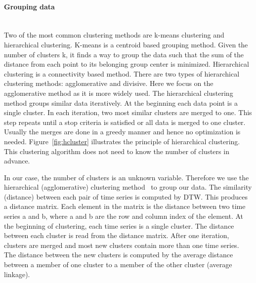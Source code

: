 \paragraph{Grouping data} ~\\
Two of the most common clustering methods are k-means clustering and hierarchical clustering. K-means is a centroid based grouping method. Given the number of clusters k, it finds a way to group the data such that the sum of the distance from each point to its belonging group center is minimized. Hierarchical clustering is a connectivity based method. There are two types of hierarchical clustering methods: agglomerative and divisive. Here we focus on the agglomerative method as it is more widely used. The hierarchical clustering method groups similar data iteratively. At the beginning each data point is a single cluster. In each iteration, two most similar clusters are merged to one. This step repeats until a stop criteria is satisfied or all data is merged to one cluster. Usually the merges are done in a greedy manner and hence no optimization is needed. Figure~\ref{fig:hcluster} illustrates the principle of hierarchical clustering. This clustering algorithm does not need to know the number of clusters in advance.

In our case, the number of clusters is an unknown variable. Therefore we use the hierarchical (agglomerative) clustering method~\cite{willett1988recent} to group our data. The similarity (distance) between each pair of time series is computed by DTW. This produces a distance matrix. Each element in the matrix is the distance between two time series a and b, where a and b are the row and column index of the element. At the beginning of clustering, each time series is a single cluster. The distance between each cluster is read from the distance matrix. After one iteration, clusters are merged and most new clusters contain more than one time series. The distance between the new clusters is computed by the average distance between a member of one cluster to a member of the other cluster (average linkage).

